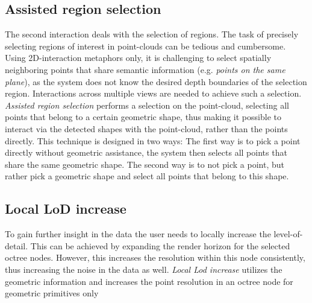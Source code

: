 \subsection{Assisted region selection}
The second interaction deals with the selection of regions. The task of precisely selecting regions of interest in point-clouds can be tedious and cumbersome. Using 2D-interaction metaphors only, it is challenging to select spatially neighboring points that share semantic information (e.g. \textit{points on the same plane}), as the system does not know the desired depth boundaries of the selection region. Interactions across multiple views are needed to achieve such a selection. \textit{Assisted region selection} performs a selection on the point-cloud, selecting all points that belong to a certain geometric shape, thus making it possible to interact via the detected shapes with the point-cloud, rather than the points directly. 
This technique is designed in two ways: 
The first way is to pick a point directly without geometric assistance, the system then selects all points that share the same geometric shape.
The second way is to not pick a point, but rather pick a geometric shape and select all points that belong to this shape. 
\\
\subsection{Local LoD increase}
To gain further insight in the data the user needs to locally increase the level-of-detail. This can be achieved by expanding the render horizon for the selected octree nodes. However, this increases the resolution within this node consistently, thus increasing the noise in the data as well. \textit{Local Lod increase} utilizes the geometric information and increases the  point resolution in an octree node for geometric primitives only
